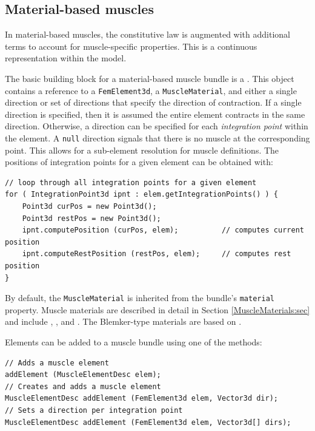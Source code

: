 \subsection{Material-based muscles}
\label{sec:fem:materialmuscle}

In material-based muscles, the constitutive law is augmented with additional
terms to account for muscle-specific properties.  This is a continuous 
representation within the model.  

The basic building block for a material-based muscle bundle is a 
.  This object contains
a reference to a {\tt FemElement3d}, a {\tt MuscleMaterial}, and either a
single direction or set of directions that specify the direction of 
contraction.  If a single direction is specified, then it is assumed the
entire element contracts in the same direction.  Otherwise, a direction
can be specified for each \emph{integration point} within the element.  A
{\tt null} direction signals that there is no muscle at the corresponding
point.  This allows for a sub-element resolution for muscle definitions. The 
positions of integration points for a given element can be obtained with:
\begin{lstlisting}[]
// loop through all integration points for a given element
for ( IntegrationPoint3d ipnt : elem.getIntegrationPoints() ) {
	Point3d curPos = new Point3d();
	Point3d restPos = new Point3d();
	ipnt.computePosition (curPos, elem);          // computes current position
	ipnt.computeRestPosition (restPos, elem);     // computes rest position
}
\end{lstlisting} 
By default, the {\tt MuscleMaterial} is inherited from the bundle's 
{\tt material} property.  Muscle materials are described
in detail in Section \ref{MuscleMaterials:sec} and
include 
, 
, and 
.  The Blemker-type
materials are based on \cite{blemker:2005:muscle}.

Elements can be added to a muscle bundle using one of the methods:
\begin{lstlisting}[]
// Adds a muscle element
addElement (MuscleElementDesc elem);          
// Creates and adds a muscle element
MuscleElementDesc addElement (FemElement3d elem, Vector3d dir);     
// Sets a direction per integration point
MuscleElementDesc addElement (FemElement3d elem, Vector3d[] dirs);  
\end{lstlisting}

